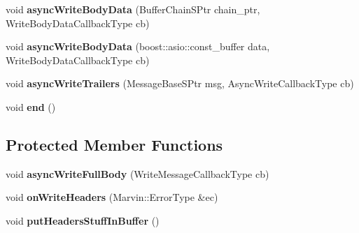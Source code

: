\begin{DoxyCompactItemize}
\item 
\mbox{\label{class_message_writer_aaf63ccacfe7b7134e75687ef7d19b48c}} 
void {\bfseries async\+Write\+Body\+Data} (Buffer\+Chain\+S\+Ptr chain\+\_\+ptr, Write\+Body\+Data\+Callback\+Type cb)
\item 
\mbox{\label{class_message_writer_af7ebe407465a33f2f343fe504bb02642}} 
void {\bfseries async\+Write\+Body\+Data} (boost\+::asio\+::const\+\_\+buffer data, Write\+Body\+Data\+Callback\+Type cb)
\item 
\mbox{\label{class_message_writer_a861b118a4ff445b27e09c43f4cac6bda}} 
void {\bfseries async\+Write\+Trailers} (Message\+Base\+S\+Ptr msg, Async\+Write\+Callback\+Type cb)
\item 
\mbox{\label{class_message_writer_ac74abc89b3ad3f2b778e7dbfe60e6a72}} 
void {\bfseries end} ()
\end{DoxyCompactItemize}
\subsection*{Protected Member Functions}
\begin{DoxyCompactItemize}
\item 
\mbox{\label{class_message_writer_adf2d412ea99f1a9a9ae198e98013f0b9}} 
void {\bfseries async\+Write\+Full\+Body} (Write\+Message\+Callback\+Type cb)
\item 
\mbox{\label{class_message_writer_aa6551bbb8ac0808823df8960a36b87bf}} 
void {\bfseries on\+Write\+Headers} (Marvin\+::\+Error\+Type \&ec)
\item 
\mbox{\label{class_message_writer_a5a0e7a5a62a95929e5a832bd48200412}} 
void {\bfseries put\+Headers\+Stuff\+In\+Buffer} ()
\end{DoxyCompactItemize}
